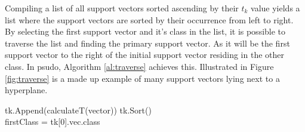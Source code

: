 \documentclass[a4paper,twoside]{bth}
\begin{document}
Compiling a list of all support vectors sorted ascending by their $t_k$  value yields a list where the support vectors are sorted by their occurrence from left to right. By selecting the first support vector  and it's class in the list, it is possible to traverse the list and finding the primary support vector. As it will be the first support vector to the right of the initial support vector residing in the other class. In psudo, Algorithm \ref{al:traverse} achieves this. Illustrated in Figure \ref{fig:traverse} is a made up example of many support vectors lying next to a hyperplane. 

\begin{algorithm}[H]\label{al:traverse}
 
 {
  tk.Append(calculateT(vector))
 }
 tk.Sort()\\
 
 firstClass = tk[0].vec.class

 \caption{Finding primary support vector}
\end{algorithm}
\end{document}
